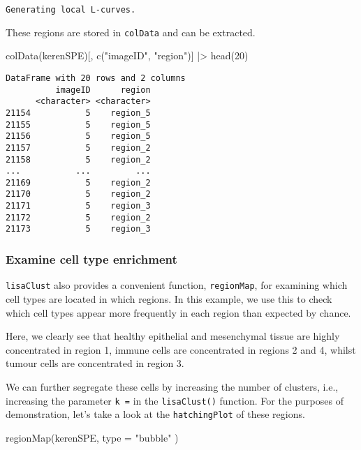\documentclass[
  letterpaper,
  DIV=11,
  numbers=noendperiod]{scrreprt}
\newenvironment{Shaded}{\begin{snugshade}}{\end{snugshade}}
\newcommand{\AttributeTok}[1]{\textcolor[rgb]{0.40,0.45,0.13}{#1}}
\newcommand{\DecValTok}[1]{\textcolor[rgb]{0.68,0.00,0.00}{#1}}
\newcommand{\FunctionTok}[1]{\textcolor[rgb]{0.28,0.35,0.67}{#1}}
\newcommand{\NormalTok}[1]{\textcolor[rgb]{0.00,0.23,0.31}{#1}}
\newcommand{\SpecialCharTok}[1]{\textcolor[rgb]{0.37,0.37,0.37}{#1}}
\newcommand{\StringTok}[1]{\textcolor[rgb]{0.13,0.47,0.30}{#1}}
\begin{document}
\begin{verbatim}
Generating local L-curves.
\end{verbatim}

These regions are stored in \texttt{colData} and can be extracted.

\begin{Shaded}
\begin{Highlighting}[]
\FunctionTok{colData}\NormalTok{(kerenSPE)[, }\FunctionTok{c}\NormalTok{(}\StringTok{"imageID"}\NormalTok{, }\StringTok{"region"}\NormalTok{)] }\SpecialCharTok{|\textgreater{}}
  \FunctionTok{head}\NormalTok{(}\DecValTok{20}\NormalTok{)}
\end{Highlighting}
\end{Shaded}

\begin{verbatim}
DataFrame with 20 rows and 2 columns
          imageID      region
      <character> <character>
21154           5    region_5
21155           5    region_5
21156           5    region_5
21157           5    region_2
21158           5    region_2
...           ...         ...
21169           5    region_2
21170           5    region_2
21171           5    region_3
21172           5    region_2
21173           5    region_3
\end{verbatim}

\subsubsection{Examine cell type
enrichment}\label{examine-cell-type-enrichment}

\texttt{lisaClust} also provides a convenient function,
\texttt{regionMap}, for examining which cell types are located in which
regions. In this example, we use this to check which cell types appear
more frequently in each region than expected by chance.

Here, we clearly see that healthy epithelial and mesenchymal tissue are
highly concentrated in region 1, immune cells are concentrated in
regions 2 and 4, whilst tumour cells are concentrated in region 3.

We can further segregate these cells by increasing the number of
clusters, i.e., increasing the parameter \texttt{k\ =} in the
\texttt{lisaClust()} function. For the purposes of demonstration, let's
take a look at the \texttt{hatchingPlot} of these regions.

\begin{Shaded}
\begin{Highlighting}[]
\FunctionTok{regionMap}\NormalTok{(kerenSPE,}
  \AttributeTok{type =} \StringTok{"bubble"}
\NormalTok{)}
\end{Highlighting}
\end{Shaded}
\end{document}
